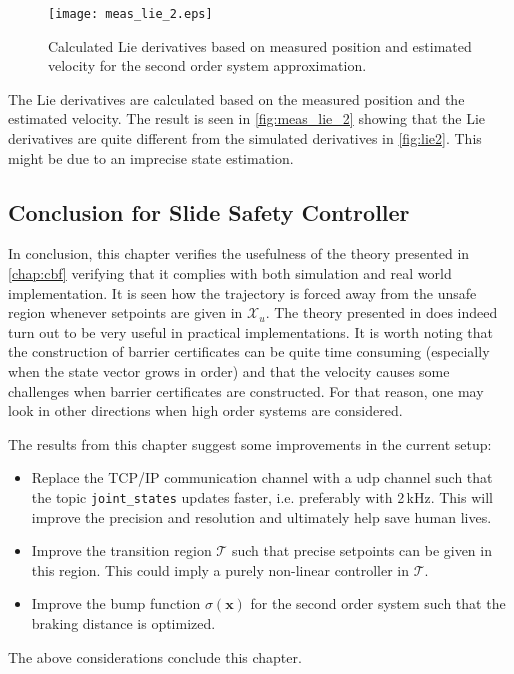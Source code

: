 \begin{figure}[H]
	\center
		\texttt{[image: meas\_lie\_2.eps]}
	\caption{Calculated Lie derivatives based on measured position and estimated velocity for the second order system approximation. }
    \label{fig:meas_lie_2}
\end{figure}
The Lie derivatives are calculated based on the measured position and the estimated velocity. The result is seen in \autoref{fig:meas_lie_2} showing that the Lie derivatives  are quite different from the simulated derivatives in \autoref{fig:lie2}. This might be due to an imprecise state estimation.

\subsection{Conclusion for Slide Safety Controller}\label{subsec:conclusion-slide-safety}
In conclusion, this chapter verifies the usefulness of the theory presented in \autoref{chap:cbf} verifying that it complies with both simulation and real world implementation. It is seen how the trajectory is forced away from the unsafe region whenever setpoints are given in $\mathcal{X}_u$. The theory presented in \citep{bib:org_control} does indeed turn out to be very useful in practical implementations. It is worth noting that the construction of barrier certificates can be quite time consuming (especially when the state vector grows in order) and that the velocity causes some challenges when barrier certificates are constructed. For that reason, one may look in other directions when high order systems are considered.

The results from this chapter suggest some improvements in the current setup:
\begin{itemize}
\item Replace the TCP/IP communication channel with a \gls{udp} channel such that the topic \texttt{joint\_states} updates faster, i.e. preferably with 2\,kHz. This will  improve the precision and resolution and ultimately help save human lives.
\item Improve the transition region $\mathcal{T}$ such that precise setpoints can be given in this region. This could imply a purely non-linear controller in $\mathcal{T}$.
\item Improve the bump function $\sigma(\mathbf{x})$ for the second order system such that the braking distance is optimized.
\end{itemize}
The above considerations conclude this chapter.